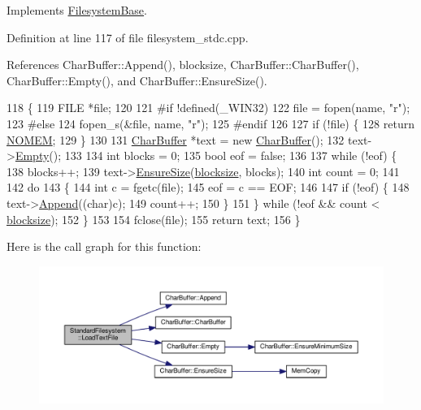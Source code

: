 Implements \hyperlink{classFilesystemBase_adc4a9e1dc189bcd221e3b994bc854d46}{Filesystem\+Base}.



Definition at line 117 of file filesystem\+\_\+stdc.\+cpp.



References Char\+Buffer\+::\+Append(), blocksize, Char\+Buffer\+::\+Char\+Buffer(), Char\+Buffer\+::\+Empty(), and Char\+Buffer\+::\+Ensure\+Size().


\begin{DoxyCode}
118 \{
119     FILE *file;
120 
121 \textcolor{preprocessor}{#if !defined(\_WIN32)}
122     file = fopen(name, \textcolor{stringliteral}{"r"});
123 \textcolor{preprocessor}{#else}
124     fopen\_s(&file, name, \textcolor{stringliteral}{"r"});
125 \textcolor{preprocessor}{#endif}
126 
127     \textcolor{keywordflow}{if} (!file) \{
128         \textcolor{keywordflow}{return} \hyperlink{platform_8h_a46ff2bfbf0d44b8466a2251d5bd5e6f8}{NOMEM};
129     \}
130 
131     \hyperlink{classCharBuffer}{CharBuffer} *text = \textcolor{keyword}{new} \hyperlink{classCharBuffer}{CharBuffer}();
132     text->\hyperlink{classCharBuffer_abe39d3fd7d8b9c8ec343af2cae7adc96}{Empty}();
133 
134     \textcolor{keywordtype}{int} blocks = 0;
135     \textcolor{keywordtype}{bool} eof = \textcolor{keyword}{false};
136 
137     \textcolor{keywordflow}{while} (!eof) \{
138         blocks++;
139         text->\hyperlink{classCharBuffer_ad1907009b5ad136692b989fa96bf2f7e}{EnsureSize}(\hyperlink{classStandardFilesystem_aa04dcecabc636b2154a0e55847f689f4}{blocksize}, blocks);
140         \textcolor{keywordtype}{int} count = 0;
141 
142         \textcolor{keywordflow}{do}
143         \{
144             \textcolor{keywordtype}{int} c = fgetc(file);
145             eof = c == EOF;
146 
147             \textcolor{keywordflow}{if} (!eof) \{
148                 text->\hyperlink{classCharBuffer_a045b38735f7b3007c1b98d3d7b7feafe}{Append}((\textcolor{keywordtype}{char})c);
149                 count++;
150             \}
151         \}  \textcolor{keywordflow}{while} (!eof && count < \hyperlink{classStandardFilesystem_aa04dcecabc636b2154a0e55847f689f4}{blocksize});
152     \}
153 
154     fclose(file);
155     \textcolor{keywordflow}{return} text;
156 \}
\end{DoxyCode}


Here is the call graph for this function\+:\nopagebreak
\begin{figure}[H]
\begin{center}
\leavevmode
\includegraphics[width=350pt]{classStandardFilesystem_aa01514561ced127f2453b3a913e077ef_cgraph}
\end{center}
\end{figure}


